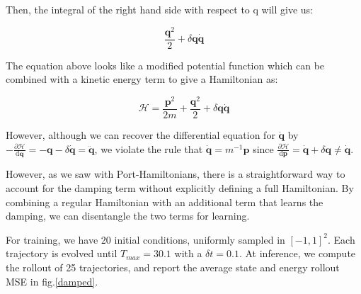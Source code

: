 \documentclass[twoside]{article}
\begin{document}
Then, the integral of the right hand side with respect to q will give us:

\begin{equation}
\frac{\mathbf{q}^2}{2} + \delta \mathbf{q} \dot{\mathbf{q}}
\end{equation}

The equation above looks like a modified potential function which can be combined with a kinetic energy term to give a Hamiltonian as:

\begin{equation}
\mathcal{H} =\frac{ \mathbf{p}^2}{2m} + \frac{\mathbf{q}^2}{2} + \delta \mathbf{q} \dot{\mathbf{q}}
\end{equation}

However, although we can recover the differential equation for $\ddot{\mathbf{q}}$ by $-\frac{\partial\mathcal{H}}{\mathrm{d}\mathbf{q}}  =-\mathbf{q} - \delta\dot{\mathbf{q}} = \ddot{\mathbf{q}}$, we violate the rule that $\dot{\mathbf{q}} = m^{-1}\mathbf{p}$ since $ \frac{\partial\mathcal{H}}{\mathrm{d}\mathbf{p}} =  \dot{\mathbf{q}} +\delta \mathbf{q} \neq \dot{\mathbf{q}} $.


However, as we saw with Port-Hamiltonians, there is a straightforward way to account for the damping term without explicitly defining a full Hamiltonian. By combining a regular Hamiltonian with an additional term that learns the damping, we can disentangle the two terms for learning.

For training, we have 20 initial conditions, uniformly sampled in $[-1,1]^2$. Each trajectory is evolved until $T_{max} = 30.1$ with a $\delta t = 0.1$. At inference, we compute the rollout of 25 trajectories, and report the average state and energy rollout MSE in fig.\ref{damped}.
\end{document}
